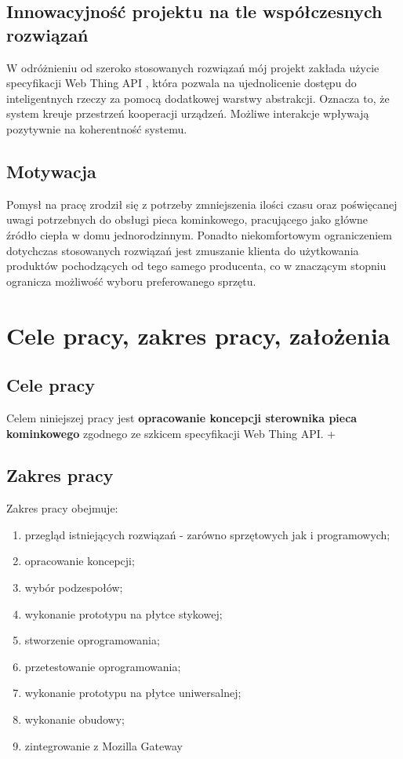 \documentclass[11pt]{report}
\begin{document}
 \section{Innowacyjność projektu na tle współczesnych rozwiązań}
 W odróżnieniu od szeroko stosowanych rozwiązań mój projekt zakłada użycie specyfikacji Web Thing API \cite{WebThing2020}, która pozwala na ujednolicenie dostępu do inteligentnych rzeczy za pomocą dodatkowej warstwy abstrakcji. Oznacza to, że system kreuje przestrzeń kooperacji urządzeń. Możliwe interakcje wpływają pozytywnie na koherentność systemu.
 
 \section{Motywacja}
Pomysł na pracę zrodził się z potrzeby zmniejszenia ilości czasu oraz poświęcanej uwagi potrzebnych do obsługi pieca kominkowego, pracującego jako główne źródło ciepła w domu jednorodzinnym. Ponadto niekomfortowym ograniczeniem dotychczas stosowanych rozwiązań jest zmuszanie klienta do użytkowania produktów pochodzących od tego samego producenta, co w znaczącym stopniu ogranicza możliwość wyboru preferowanego sprzętu.

 \chapter{Cele pracy, zakres pracy, założenia}\label{ch:cele}

 \section{Cele pracy}
 Celem niniejszej pracy jest \textbf{opracowanie koncepcji sterownika pieca kominkowego} zgodnego ze szkicem specyfikacji Web Thing API.
 +
 \section{Zakres pracy}
 Zakres pracy obejmuje:
 \begin{enumerate}
 \item przegląd istniejących rozwiązań - zarówno sprzętowych jak i programowych;
 \item opracowanie koncepcji;
 \item wybór podzespołów;
 \item wykonanie prototypu na płytce stykowej;
 \item stworzenie oprogramowania;
 \item przetestowanie oprogramowania; 
 \item wykonanie prototypu na płytce uniwersalnej;
 \item wykonanie obudowy;
 \item zintegrowanie z Mozilla Gateway
 \end{enumerate}
 
\end{document}
